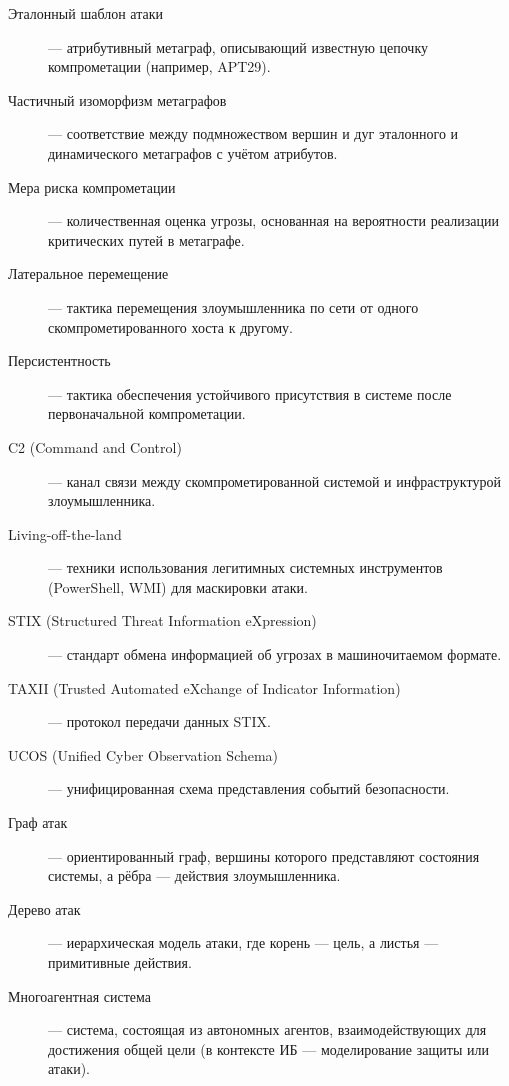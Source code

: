 \begin{description}
    \item[Эталонный шаблон атаки] — атрибутивный метаграф, описывающий известную цепочку компрометации (например, APT29).
    \item[Частичный изоморфизм метаграфов] — соответствие между подмножеством вершин и дуг эталонного и динамического метаграфов с учётом атрибутов.
    \item[Мера риска компрометации] — количественная оценка угрозы, основанная на вероятности реализации критических путей в метаграфе.
    \item[Латеральное перемещение] — тактика перемещения злоумышленника по сети от одного скомпрометированного хоста к другому.
    \item[Персистентность] — тактика обеспечения устойчивого присутствия в системе после первоначальной компрометации.
    \item[C2 (Command and Control)] — канал связи между скомпрометированной системой и инфраструктурой злоумышленника.
    \item[Living-off-the-land] — техники использования легитимных системных инструментов (PowerShell, WMI) для маскировки атаки.
    \item[STIX (Structured Threat Information eXpression)] — стандарт обмена информацией об угрозах в машиночитаемом формате.
    \item[TAXII (Trusted Automated eXchange of Indicator Information)] — протокол передачи данных STIX.
    \item[UCOS (Unified Cyber Observation Schema)] — унифицированная схема представления событий безопасности.
    \item[Граф атак] — ориентированный граф, вершины которого представляют состояния системы, а рёбра — действия злоумышленника.
    \item[Дерево атак] — иерархическая модель атаки, где корень — цель, а листья — примитивные действия.
    \item[Многоагентная система] — система, состоящая из автономных агентов, взаимодействующих для достижения общей цели (в контексте ИБ — моделирование защиты или атаки).
\end{description}